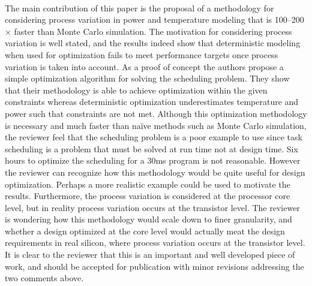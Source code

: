 \begin{reviewer}
\\
The main contribution of this paper is the proposal of a methodology for
considering process variation in power and temperature modeling that is
100--200$\times$ faster than Monte Carlo simulation. The motivation for
considering process variation is well stated, and the results indeed show that
deterministic modeling when used for optimization fails to meet performance
targets once process variation is taken into account. As a proof of concept the
authors propose a simple optimization algorithm for solving the scheduling
problem. They show that their methodology is able to achieve optimization
within the given constraints whereas deterministic optimization underestimates
temperature and power such that constraints are not met. Although this
optimization methodology is necessary and much faster than na\"{i}ve methods
such as Monte Carlo simulation, the reviewer feel that the scheduling problem
is a poor example to use since task scheduling is a problem that must be solved
at run time not at design time. Six hours to optimize the scheduling for a 30ms
program is not reasonable. However the reviewer can recognize how this
methodology would be quite useful for design optimization. Perhaps a more
realistic example could be used to motivate the results. Furthermore, the
process variation is considered at the processor core level, but in reality
process variation occurs at the transistor level. The reviewer is wondering how
this methodology would scale down to finer granularity, and whether a design
optimized at the core level would actually meat the design requirements in real
silicon, where process variation occurs at the transistor level. It is clear to
the reviewer that this is an important and well developed piece of work, and
should be accepted for publication with minor revisions addressing the two
comments above.
\end{reviewer}

\begin{authors}
\begin{actions}
\end{actions}
\end{authors}
